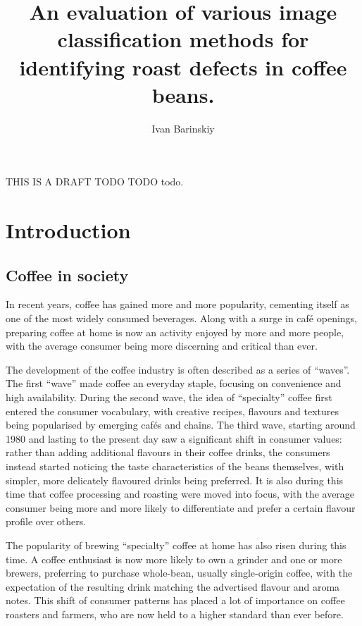 \documentclass{./styles/UoYCSproject}
\author{Ivan Barinskiy}
\title{An evaluation of various image classification methods for identifying roast defects in coffee beans.}
\newcommand{\eaccentmark}{é}
\begin{document}
\maketitle
\listoffigures
\listoftables

\begin{summary}
THIS IS A DRAFT TODO TODO todo.
\end{summary}

\chapter{Introduction}
\label{ch:introduction}
\section{Coffee in society}
\label{sec:coffee-in-society}
In recent years, coffee has gained more and more popularity, cementing itself as one of the most widely consumed beverages.
Along with a surge in caf{\eaccentmark} openings, preparing coffee at home is now an activity enjoyed by more and more people, with the average consumer being more discerning and critical than ever.

The development of the coffee industry is often described as a series of ``waves''.
The first ``wave'' made coffee an everyday staple, focusing on convenience and high availability.
During the second wave, the idea of ``specialty'' coffee first entered the consumer vocabulary, with creative recipes, flavours and textures being popularised by emerging caf{\eaccentmark}s and chains.
The third wave, starting around 1980 and lasting to the present day saw a significant shift in consumer values:
rather than adding additional flavours in their coffee drinks, the consumers instead started noticing the taste characteristics of the beans themselves,
with simpler, more delicately flavoured drinks being preferred.
It is also during this time that coffee processing and roasting were moved into focus,
with the average consumer being more and more likely to differentiate and prefer a certain flavour profile over others.

The popularity of brewing ``specialty'' coffee at home has also risen during this time.
A coffee enthusiast is now more likely to own a grinder and one or more brewers, preferring to purchase whole-bean,
usually single-origin coffee, with the expectation of the resulting drink matching the advertised flavour and aroma notes.
This shift of consumer patterns has placed a lot of importance on coffee roasters and farmers,
who are now held to a higher standard than ever before.
\end{document}
